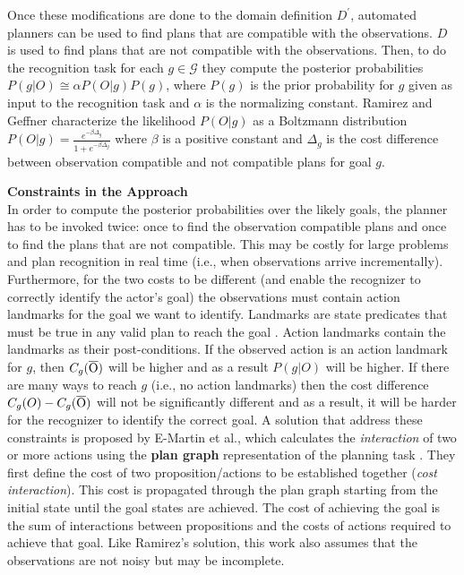Once these modifications are done to the domain definition $D^\prime$, automated planners can be used to find plans that are compatible with the observations. $D$ is used to find plans that are not compatible with the observations. Then, to do the recognition task for each $g\in \mathcal{G}$ they compute the posterior probabilities $P(g|O) \cong \alpha P(O|g) P(g) $, where $P(g)$ is the prior probability for $g$ given as input to the recognition task and $\alpha$ is the normalizing constant. Ramirez and Geffner characterize the likelihood $P(O|g)$ as a Boltzmann distribution $P(O|g)=\frac{e^{-\beta\Delta_g}}{1+e^{-\beta\Delta_g}}$ where $\beta$ is a positive constant and $\Delta_g$ is the cost difference between observation compatible and not compatible plans for goal $g$.

\noindent\textbf{Constraints in the Approach}\\
In order to compute the posterior probabilities over the likely goals, the planner has to be invoked twice: once to find the observation compatible plans and once to find the plans that are not compatible. 
This may be costly for large problems and plan recognition in real time (i.e., when observations arrive incrementally). 
Furthermore, for the two costs to be different (and enable the recognizer to correctly identify the actor's goal) the observations must contain action landmarks for the goal we want to identify.
Landmarks are state predicates that must be true in any valid plan to reach the goal \cite{hoffman2004lm}.
Action landmarks contain the landmarks as their post-conditions. 
If the observed action is an action landmark for $g$, then $C_g{(\overline{\rm O})}$ will be higher and as a result $P(g|O)$ will be higher. If there are many ways to reach $g$ (i.e., no action landmarks) then the cost difference $C_g(O) - C_g{(\overline{\rm O})}$ will not be significantly different and as a result, it will be harder for the recognizer to identify the correct goal. 
A solution that address these constraints is proposed by E-Martin et al., which calculates the \textit{interaction} of two or more actions \cite{yolanda2015} using the \textbf{plan graph} representation of the planning task  \cite{blum1997fast}. 
They first define the cost of two proposition/actions to be established together (\textit{cost interaction}). 
This cost is propagated through the plan graph starting from the initial state until the goal states are achieved. 
The cost of achieving the goal is the sum of interactions between propositions and the costs of actions required to achieve that goal.
Like Ramirez's solution, this work also assumes that the observations are not noisy but may be incomplete.

